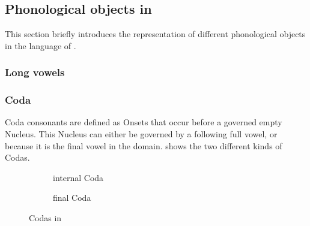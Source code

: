 \subsection{Phonological objects in \CVCV}
\label{subsec:intro:obj}

This section briefly introduces the representation
of different phonological objects in the language of
\CVCV.



\subsubsection{Long vowels}
\begin{structure}{}
\end{structure}


\subsubsection{Coda}\label{intro:obj:coda}
Coda consonants are defined as Onsets that occur before
a governed empty Nucleus. \parencite[p.~192]{scheer2004}
This Nucleus can either be governed by a following full
vowel,  or because it is the final
vowel in the domain.
 shows the two different kinds
of Codas.

\begin{figure}[h]
  \centering
  \begin{subfigure}{.49\textwidth}
    \centering
    \begin{structure}{}
      \emptyV[gov]
    \end{structure}
    \caption{internal Coda}
  \end{subfigure}
  \hfill
  \begin{subfigure}{.49\textwidth}
    \centering
    \begin{structure}{}
      \fen
    \end{structure}
    \caption{final Coda}
  \end{subfigure}
  \caption{Codas in \CVCV}
  \label{fig:intro:obj:coda}
\end{figure}

